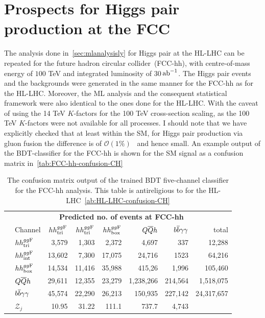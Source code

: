\chapter{ Prospects for Higgs pair production at the FCC }\label{app:fcc}
The analysis done in~\autoref{sec:mlanalysisly} for Higgs pair at the HL-LHC can be repeated for the future hadron circular collider~(FCC-hh), with centre-of-mass energy of $100$ TeV and integrated luminosity of 30$\,{\rm ab}^{-1}$. The Higgs pair events and the backgrounds were generated in the same manner for the FCC-hh as for the HL-LHC. Moreover, the ML analysis  and the consequent statistical framework were also identical to the ones done for the HL-LHC. 
 With the caveat of using the 14 TeV $K$-factors for the 100 TeV cross-section scaling, as the 100 TeV $K$-factors were not available for all processes. I should note that we have explicitly checked that at least within the SM, for Higgs pair production via gluon fusion the difference is of $\mathcal{O}(1\%)$~\cite{Maltoni:2014eza} and hence small. An example output of the BDT-classifier for the FCC-hh is shown for the SM signal as a confusion matrix in~\autoref{tab:FCC-hh-confusion-CH}\\
 \begin{table}[]
 	\centering
 	{\footnotesize
 		\begin{tabular}{ll|rrrrr|r}
 			\multirow{7}{*}{\rb{\bf Actual no. of events\hspace{0.45cm}}} & \multicolumn{7}{c}{\bf Predicted no. of events at FCC-hh}\\
 			\cmidrule[\heavyrulewidth]{2-8}
 			& Channel & $hh^{gg\rm F}_{\rm tri}$ & $hh^{gg\rm F}_{\rm tri}$ &  $hh^{gg\rm F}_{\rm box}$&      $Q\overline Q h$ & $b\overline b\gamma\gamma$ &   total \\
 			\cline{2-8}
 			&$hh^{gg\rm F}_{\rm tri}$       &  	3,579& 1,303&	2,372&	4,697&	337&	12,288 \\
 			&$hh^{gg\rm F}_{\rm int}$       &  13,602& 7,300&	17,075&	24,716&	1523&	64,216 \\
 			&$hh^{gg\rm F}_{\rm box}$       &  14,534&	11,416&	35,988&	415,26& 1,996&	105,460 \\
 			&$Q\overline Q h$         & 29,611&	12,355&	23,279&	1,238,266&	214,564&	1,518,075 \\
 			&$b\overline b\gamma\gamma$        &  45,574&	22,290&	26,213&	150,935&	227,142&	24,317,657 \\
 			\cline{2-8}
 			&$\mathcal{Z}_j$&   	10.95&	31.22&	111.1&	737.7&	4,743&	 \\
 			\cmidrule[\heavyrulewidth]{2-8}
 		\end{tabular}
 	}
 		\caption{The confusion matrix output of the trained BDT  five-channel classifier for the FCC-hh analysis. This table is antireligious to for the HL-LHC~\autoref{ab:HL-LHC-confusion-CH}}
 	\label{tab:FCC-hh-confusion-CH}
 \end{table}
